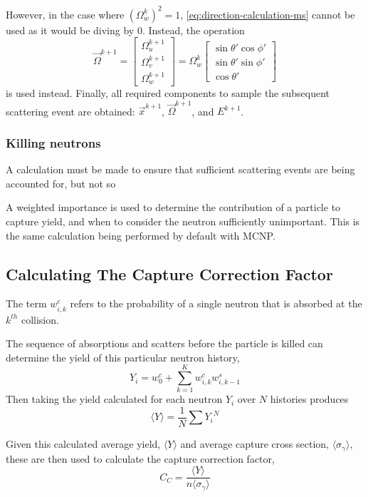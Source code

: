 However, in the case where $\left(\Omega_w^k\right)^2 = 1$, \autoref{eq:direction-calculation-ms} cannot be used as it would be diving by 0. Instead, the operation
\begin{equation}
        \overrightarrow{\Omega}^{k+1} = \begin{bmatrix}
        \Omega^{k+1}_u \\[8pt]
        \Omega^{k+1}_v \\[8pt]
        \Omega^{k+1}_w
    \end{bmatrix} = \Omega_w^k     \begin{bmatrix}
        \sin{\theta'}\cos{\phi'} \\[8pt]
        \sin{\theta'}\sin{\phi'} \\[8pt]
        \cos{\theta'}
    \end{bmatrix}
\end{equation}
is used instead. Finally, all required components to sample the subsequent scattering event are obtained: $\overrightarrow{x}^{k+1}$, $\overrightarrow{\Omega}^{k+1}$, and $E^{k+1}$.

\subsubsection{Killing neutrons}
\label{sec:killing-neutrons-ms}
A calculation must be made to ensure that sufficient scattering events are being accounted for, but not so

A weighted importance is used to determine the contribution of a particle to capture yield, and when to consider the neutron sufficiently unimportant. This is the same calculation being performed by default with MCNP\cite{mcnp}. 

\subsection{Calculating The Capture Correction Factor}

The term $w_{i,k}^{c}$ refers to the probability of a single neutron that is absorbed at the $k^{th}$ collision. 

The sequence of absorptions and scatters before the particle is killed can determine the yield of this particular neutron history,
\begin{equation}
    \label{eq:single-history-yield}
    Y_i = w_0^{c} + \sum_{k=1}^{K} w_{i,k}^{c}w_{i,k-1}^{s}
\end{equation}
Then taking the yield calculated for each neutron $Y_i$ over $N$ histories produces
\begin{equation}
    \label{eq:average-yield}
    \langle Y \rangle = \frac{1}{N}\sum{Y_i}^{N}
\end{equation}

Given this calculated average yield, $\langle Y \rangle$ and average capture cross section, $\langle \sigma_\gamma \rangle$, these are then used to calculate the capture correction factor,
\begin{equation}
    \label{eq:capture-correction}
    C_C = \frac{\langle Y \rangle}{n \langle \sigma_\gamma \rangle}
\end{equation}